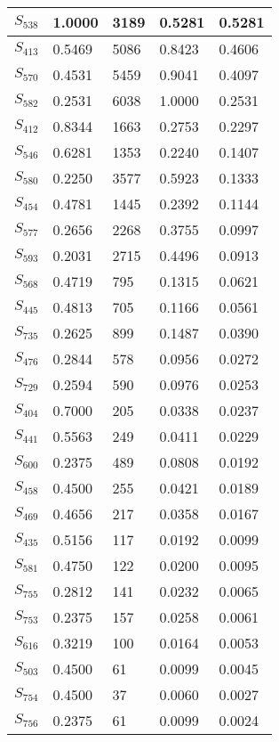 \begin{xltabular}{\textwidth}{|X|X|X|X|X|}
        \hline
        \endlastfoot
    $S_{538}$ & 1.0000 & 3189 & 0.5281 & 0.5281 \\ \hline
 $S_{413}$ & 0.5469 & 5086 & 0.8423 & 0.4606 \\ \hline
 $S_{570}$ & 0.4531 & 5459 & 0.9041 & 0.4097 \\ \hline
 $S_{582}$ & 0.2531 & 6038 & 1.0000 & 0.2531 \\ \hline
 $S_{412}$ & 0.8344 & 1663 & 0.2753 & 0.2297 \\ \hline
 $S_{546}$ & 0.6281 & 1353 & 0.2240 & 0.1407 \\ \hline
 $S_{580}$ & 0.2250 & 3577 & 0.5923 & 0.1333 \\ \hline
 $S_{454}$ & 0.4781 & 1445 & 0.2392 & 0.1144 \\ \hline
 $S_{577}$ & 0.2656 & 2268 & 0.3755 & 0.0997 \\ \hline
 $S_{593}$ & 0.2031 & 2715 & 0.4496 & 0.0913 \\ \hline
 $S_{568}$ & 0.4719 & 795 & 0.1315 & 0.0621 \\ \hline
 $S_{445}$ & 0.4813 & 705 & 0.1166 & 0.0561 \\ \hline
 $S_{735}$ & 0.2625 & 899 & 0.1487 & 0.0390 \\ \hline
 $S_{476}$ & 0.2844 & 578 & 0.0956 & 0.0272 \\ \hline
 $S_{729}$ & 0.2594 & 590 & 0.0976 & 0.0253 \\ \hline
 $S_{404}$ & 0.7000 & 205 & 0.0338 & 0.0237 \\ \hline
 $S_{441}$ & 0.5563 & 249 & 0.0411 & 0.0229 \\ \hline
 $S_{600}$ & 0.2375 & 489 & 0.0808 & 0.0192 \\ \hline
 $S_{458}$ & 0.4500 & 255 & 0.0421 & 0.0189 \\ \hline
 $S_{469}$ & 0.4656 & 217 & 0.0358 & 0.0167 \\ \hline
 $S_{435}$ & 0.5156 & 117 & 0.0192 & 0.0099 \\ \hline
 $S_{581}$ & 0.4750 & 122 & 0.0200 & 0.0095 \\ \hline
 $S_{755}$ & 0.2812 & 141 & 0.0232 & 0.0065 \\ \hline
 $S_{753}$ & 0.2375 & 157 & 0.0258 & 0.0061 \\ \hline
 $S_{616}$ & 0.3219 & 100 & 0.0164 & 0.0053 \\ \hline
 $S_{503}$ & 0.4500 & 61 & 0.0099 & 0.0045 \\ \hline
 $S_{754}$ & 0.4500 & 37 & 0.0060 & 0.0027 \\ \hline
 $S_{756}$ & 0.2375 & 61 & 0.0099 & 0.0024 \\ \hline

\end{xltabular}
